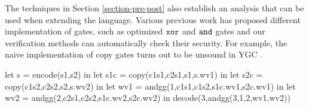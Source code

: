 The techniques in Section \ref{section-pre-post} also establish an
analysis that can be used when extending the language. Various
previous work has proposed different implementation of gates, such as
optimized $\texttt{xor}$ and $\texttt{and}$ gates \cite{XXX} and our
verification methods can automatically check their security. For
example, the naive implementation of copy gates turns out to be
unsound in YGC \cite{XXX}.
  
\begin{verbatimtab}
  let s = encode(s1,s2) in
  let s1c = copy(c1s1,c2s1,s1,s.wv1) in
  let s2c = copy(c1s2,c2s2,s2,s.wv2) in
  let wv1 = andgg(1,c1s1,c1s2,s1c.wv1,s2c.wv1) in
  let wv2 = andgg(2,c2s1,c2s2,s1c.wv2,s2c.wv2) in
  decode(3,andgg(3,1,2,wv1,wv2))
\end{verbatimtab}
